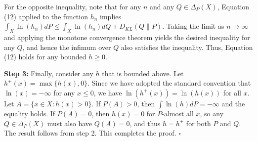 \documentclass[12pt,a4paper]{article}
\newenvironment{original}
  {\par\noindent\color{black}\smallskip}
  {\par\smallskip}
\begin{document}
\begin{original}
For the opposite inequality, note that for any $n$ and any $Q \in \Delta_P(X)$, Equation (12) applied to the function $h_n$ implies $\int_X \ln(h_n) dP \leq \int_X \ln(h_n) dQ + D_{KL}(Q\|P)$. Taking the limit as $n \to \infty$ and applying the monotone convergence theorem yields the desired inequality for any $Q$, and hence the infimum over $Q$ also satisfies the inequality. Thus, Equation (12) holds for any bounded $h \geq 0$.

\textbf{Step 3:} Finally, consider any $h$ that is bounded above. Let $h^+(x) = \max\{h(x), 0\}$. Since we have adopted the standard convention that $\ln(x) = -\infty$ for any $x \leq 0$, we have $\ln(h^+(x)) = \ln(h(x))$ for all $x$. Let $A = \{ x \in X : h(x) > 0 \}$. If $P(A) > 0$, then $\int \ln(h) dP = -\infty$ and the equality holds. If $P(A) = 0$, then $h(x) = 0$ for $P$-almost all $x$, so any $Q \in \Delta_P(X)$ must also have $Q(A) = 0$, and thus $h = h^+$ for both $P$ and $Q$. The result follows from step 2. This completes the proof. $\square$
\end{original}
\end{document}
